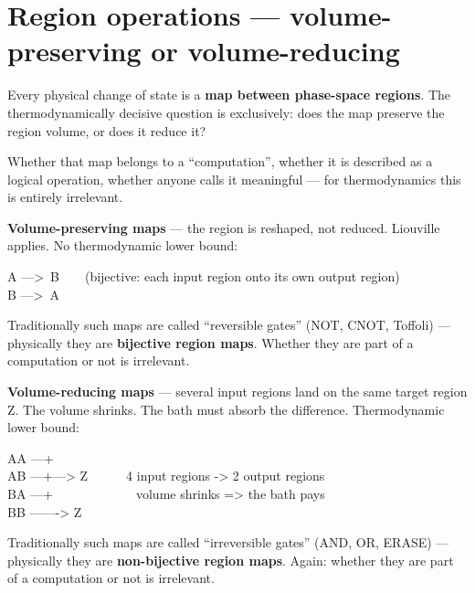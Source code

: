 \section{Region operations --- volume-preserving or volume-reducing}
\label{sec:regionops}

Every physical change of state is a \textbf{map between phase-space regions}. The
thermodynamically decisive question is exclusively: does the map preserve the
region volume, or does it reduce it?

Whether that map belongs to a “computation”, whether it is described as a logical
operation, whether anyone calls it meaningful --- for thermodynamics this is
entirely irrelevant.

\LB \textbf{Volume-preserving maps} --- the region is reshaped, not reduced.
Liouville applies. No thermodynamic lower bound:

\begin{center}
\begin{minipage}{0.78\textwidth}
\ttfamily\small
A --->\ B\ \ \ \ (bijective: each input region onto its own output region)\\
B --->\ A
\end{minipage}
\end{center}

Traditionally such maps are called “reversible gates” (NOT, CNOT, Toffoli) ---
physically they are \textbf{bijective region maps}. Whether they are part of a
computation or not is irrelevant.

\LB \textbf{Volume-reducing maps} --- several input regions land on the same
target region Z. The volume shrinks. The bath must absorb the difference.
Thermodynamic lower bound:

\begin{center}
\begin{minipage}{0.78\textwidth}
\ttfamily\small
AA ---+\\
AB ---+---> Z\ \ \ \ \ \ 4 input regions -> 2 output regions\\
BA ---+\ \ \ \ \ \ \ \ \ \ \ \ \ volume shrinks => the bath pays\\
BB -------> Z
\end{minipage}
\end{center}

Traditionally such maps are called “irreversible gates” (AND, OR, ERASE) ---
physically they are \textbf{non-bijective region maps}. Again: whether they are
part of a computation or not is irrelevant.

